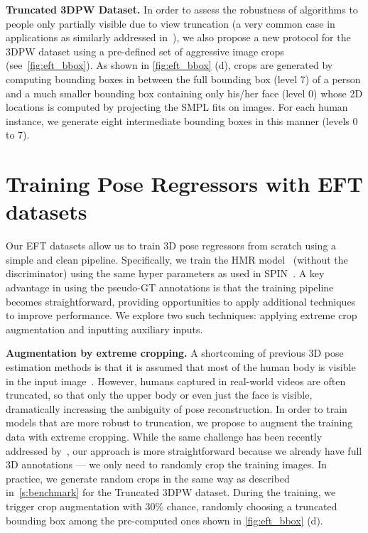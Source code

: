 \documentclass[10pt,twocolumn,letterpaper]{article}
\begin{document}
	\noindent \textbf{Truncated 3DPW Dataset.}\label{s:benchmark_truncated_3dpw}
In order to assess the robustness of algorithms to people only partially visible due to view truncation (a very common case in applications as similarly addressed in~\cite{Rockwell2020}), we also propose a new protocol for the 3DPW dataset using a pre-defined set of aggressive image crops (see~\cref{fig:eft_bbox}).
	As shown in \cref{fig:eft_bbox} (d), crops are generated by computing bounding boxes in between the full bounding box (level 7) of a person and a much smaller bounding box containing only his/her face (level 0) whose 2D locations is computed by projecting the SMPL fits on images.
	For each human instance, we generate eight intermediate bounding boxes in this manner (levels 0 to 7).
	
	
	\section{Training Pose Regressors with EFT datasets}\label{s:details}
	
Our EFT datasets allow us to train 3D pose regressors from scratch using a simple and clean pipeline.
	Specifically, we train the HMR model~\cite{kanazawa2018end} (without the discriminator) using the same hyper parameters as used in SPIN~\cite{kolotouros2019spin}. 
A key advantage in using the pseudo-GT annotations is that the training pipeline becomes straightforward, providing opportunities to apply additional techniques to improve performance.
	We explore two such techniques: applying extreme crop augmentation and inputting auxiliary inputs.
	
	\noindent \textbf{Augmentation by extreme cropping.}
A shortcoming of previous 3D pose estimation methods is that it is assumed that most of the human body is visible in the input image~\cite{xu2019denserac,guler2019holopose,kanazawa2018end,kolotouros2019spin}.
	However, humans captured in real-world videos are often truncated, so that only the upper body or even just the face is visible, dramatically increasing the ambiguity of pose reconstruction.
	In order to train models that are more robust to truncation, we propose to augment the training data with extreme cropping.
	While the same challenge has been recently addressed by~\cite{Rockwell2020}, our approach is more straightforward because we already have full 3D annotations --- we only need to randomly crop the training images.
	In practice, we generate random crops in the same way as described in~\cref{s:benchmark} for the Truncated 3DPW dataset.
	During the training, we trigger crop augmentation with 30\% chance, randomly choosing a truncated bounding box among the pre-computed ones shown in \cref{fig:eft_bbox} (d).
	
\end{document}
